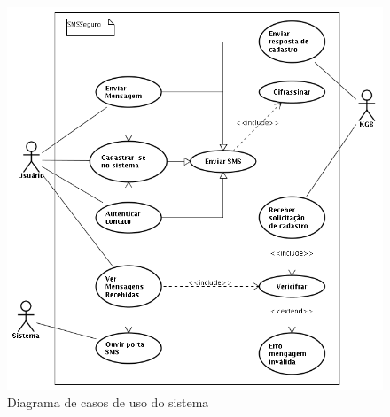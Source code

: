 \documentclass[a4paper,capchap,espacoduplo,normaltoc]{abntepusp}
\begin{document}
\begin{figure}[h]
	\centering
		\includegraphics[width=1.00\textwidth]{figuras/usecase_diagram.PNG}
	\caption{Diagrama de casos de uso do sistema}
	\label{fig:usecase_diagrama}
\end{figure}
\end{document}
